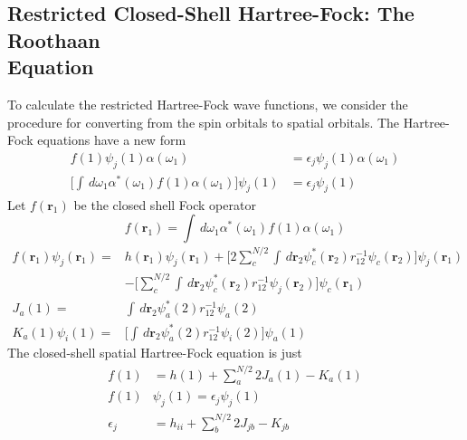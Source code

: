 \documentclass[11pt]{article}
\begin{document}
\subsection{Restricted Closed-Shell Hartree-Fock: The Roothaan \\Equation}
To calculate the restricted Hartree-Fock wave functions, we consider the procedure for converting from the spin orbitals
to spatial orbitals. The Hartree-Fock equations have a new form
\begin{align}
    f(1)\psi_j(1)\alpha(\omega_1)&=\epsilon_j\psi_j(1)\alpha(\omega_1)\\
    \bigg[\int\,d\omega_1 \alpha^*(\omega_1)f(1)\alpha(\omega_1)\bigg]\psi_j(1)&=\epsilon_j\psi_j(1)
\end{align}
Let $f(\mathbf{r}_1)$ be the closed shell Fock operator
\begin{equation}
    f(\mathbf{r}_1)=\int\,d\omega_1\alpha^*(\omega_1)f(1)\alpha(\omega_1)
\end{equation}
\begin{equation}
    \begin{split}
        f(\mathbf{r}_1)\psi_j(\mathbf{r}_1)=&h(\mathbf{r}_1)\psi_j(\mathbf{r}_1)+\bigg[2\sum_{c}^{N/2}\int\,d\mathbf{r}_2\psi_c^*(\mathbf{r}_2)r_{12}^{-1}\psi_c(\mathbf{r}_2)\bigg]\psi_j(\mathbf{r}_1)\\
        &-\bigg[\sum_{c}^{N/2}\int\,d\mathbf{r}_2\psi_c^*(\mathbf{r}_2)r_{12}^{-1}\psi_j(\mathbf{r}_2)\bigg]\psi_c(\mathbf{r}_1)\\
        J_a(1)=&\int\,d\mathbf{r}_2\psi_a^*(2)r_{12}^{-1}\psi_a(2)\\
        K_a(1)\psi_i(1)=&\bigg[\int\,d\mathbf{r}_2\psi_a^*(2)r_{12}^{-1}\psi_i(2)\bigg]\psi_a(1)
    \end{split}
\end{equation}
The closed-shell spatial Hartree-Fock equation is just
\begin{align}
    f(1)&=h(1)+\sum_{a}^{N/2}2J_a(1)-K_a(1)\\
    f(1)&\psi_j(1)=\epsilon_j\psi_j(1)\\
    \epsilon_j&=h_{ii}+\sum_{b}^{N/2}2J_{jb}-K_{jb}
\end{align}
\end{document}
